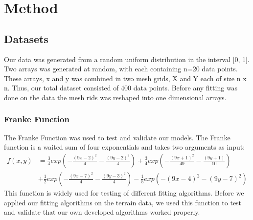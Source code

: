 \section{Method}




\subsection{Datasets}
Our data was generated from a random uniform distribution in the interval [0,
1]. Two arrays was generated at random, with each containing n=20 data points. 
These arrays, x and y was combined in two mesh grids, X and Y each of size n x n. Thus, our
total dataset consisted of 400 data points. Before any fitting was done on the
data the mesh rids was reshaped into one dimensional arrays.  

\subsubsection{Franke Function}

The Franke Function was used to test and validate our models. 
The Franke function is a waited sum of four exponentials and takes two
arguments as input: 
\begin{align*}
    \label{eq:franke_function} 
    f(x,y) &= \frac{3}{4}exp\left(-\frac{(9x-2)^2}{4}-\frac{(9y-2)^2}{4} \right)
    + \frac{3}{4}exp\left(-\frac{(9x+1)^2}{49}-\frac{(9y+1)}{10} \right) \\
           &+ \frac{1}{2}exp\left(-\frac{(9x-7)^2}{4}-\frac{(9y-3)^2}{4}
           \right)-\frac{1}{5}exp(-(9x-4)^2-(9y-7)^2)
\end{align*}
This function is widely used for testing of different fitting algorithms. 
Before we applied our fitting algorithms on the terrain data, we used this function
to test and validate that our own developed algorithms worked properly.    

